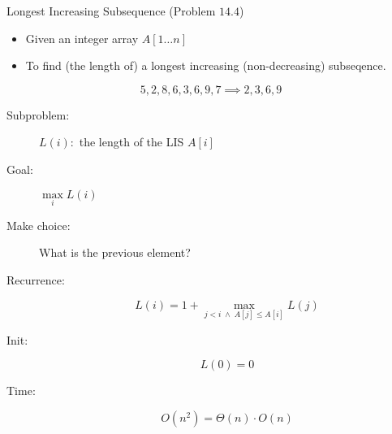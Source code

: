
\begin{frame}{}
  \begin{exampleblock}{Longest Increasing Subsequence (Problem $14.4$)}
    \begin{itemize}
      \item Given an integer array $A[1 \ldots n]$
      \item To find (the length of) a longest increasing (non-decreasing) subseqence.
    \end{itemize}
  \end{exampleblock}

  \[
    5,2,8,6,3,6,9,7 \implies 2, 3, 6, 9
  \]
\end{frame}

\begin{frame}{}
  \begin{description}
    \item[Subproblem:] $L(i):$ the length of the LIS  $A[i]$
    \item[Goal:] $\max\limits_{i} L(i)$
      \pause
    \item[Make choice:] What is the previous element?
    \item[Recurrence:] 
      \[
	L(i) = 1 + \max_{j < i \;\land\; A[j] \le A[i]} L(j)
      \]
      \pause
    \item[Init:]
      \[
	L(0) = 0
      \]
    \item[Time:] 
      \[
	O(n^2) = \Theta(n) \cdot O(n)
      \]
  \end{description}
\end{frame}
